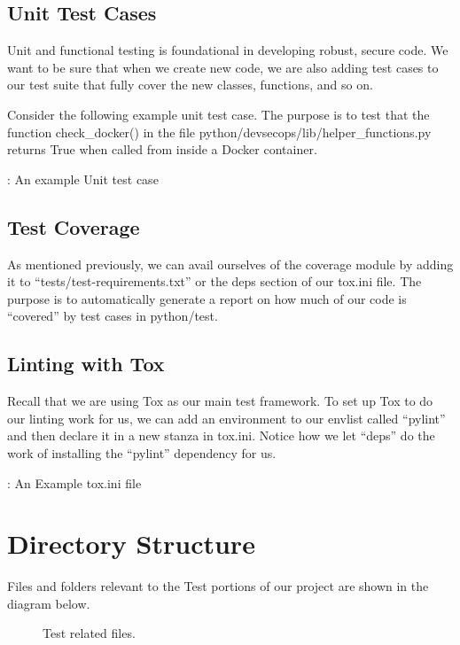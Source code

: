 \subsection{Unit Test Cases}

\justifying
Unit and functional testing is foundational in developing robust, secure code. We want to be sure that when we create new code, we are also adding
test cases to our test suite that fully cover the new classes, functions, and so on.

\justifying
Consider the following example unit test case. The purpose is to test that the function check\_docker() in the file python/devsecops/lib/helper\_functions.py
returns True when called from inside a Docker container.

\begin{mybox}{\thetcbcounter: An example Unit test case}
	
\end{mybox}

\subsection{Test Coverage}

\justifying
As mentioned previously, we can avail ourselves of the coverage module by adding it to ``tests/test-requirements.txt'' or
the deps section of our tox.ini file. The purpose is to automatically generate a report on how much of our code
is ``covered'' by test cases in python/test.

\subsection{Linting with Tox}

Recall that we are using Tox as our main test framework. To set up Tox to do our linting work for us, we can add an environment to our envlist
called ``pylint'' and then declare it in a new stanza in tox.ini. Notice how we let ``deps'' do the work of installing the ``pylint'' dependency for
us.

\begin{mybox}{\thetcbcounter: An Example tox.ini file}
	
\end{mybox}

\section{Directory Structure}
\justifying
Files and folders relevant to the Test portions of our project are shown in the diagram below.

\begin{figure}[!htb]
	\centering
	
	\caption{Test related files.}
	\label{testfiles}
\end{figure}

